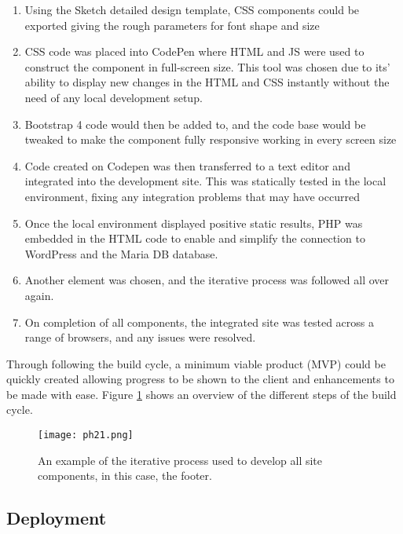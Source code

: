 \documentclass[fontsize=11pt]{extarticle}
\numberwithin{figure}{section} %
\numberwithin{table}{section}%
\providecommand{\tightlist}{%
  \setlength{\itemsep}{0pt}\setlength{\parskip}{0pt}}
\begin{document}
\begin{enumerate}

\tightlist
\item
  Using the Sketch detailed design template, CSS components could be
  exported giving the rough parameters for font shape and size
\item
  CSS code was placed into CodePen where HTML and JS were used to
  construct the component in full-screen size. This tool was chosen due
  to its' ability to display new changes in the HTML and CSS instantly
  without the need of any local development setup.
\item
  Bootstrap 4 code would then be added to, and the code base would be
  tweaked to make the component fully responsive working in every screen
  size
\item
  Code created on Codepen was then transferred to a text editor and
  integrated into the development site. This was statically tested in
  the local environment, fixing any integration problems that may have
  occurred
\item
  Once the local environment displayed positive static results, PHP was
  embedded in the HTML code to enable and simplify the connection to
  WordPress and the Maria DB database.
\item
  Another element was chosen, and the iterative process was followed all
  over again.
\item
  On completion of all components, the integrated site was tested across
  a range of browsers, and any issues were resolved.
\end{enumerate}

Through following the build cycle, a minimum viable product (MVP) could
be quickly created allowing progress to be shown to the client and
enhancements to be made with ease. Figure \ref{buildcycleimg} shows an
overview of the different steps of the build cycle.

\begin{figure}[H]
      \centering
      \texttt{[image: ph21.png]}
      \caption{An example of the iterative process used to develop all site components, in this case, the footer.}
\label{buildcycleimg}
 \end{figure}

\hypertarget{deployment}{%
\subsection{Deployment}\label{deployment}}
\end{document}
